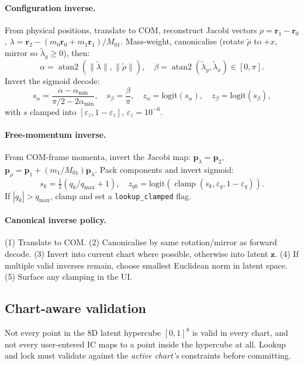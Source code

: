 \documentclass[11pt]{report}
\def\boldsymbol#1{#1}%
\DeclareMathOperator{\atanTwo}{atan2}
\DeclareMathOperator{\clamp}{clamp}
\begin{document}
\paragraph{Configuration inverse.} From physical positions, translate to COM, reconstruct Jacobi vectors $\boldsymbol\rho=\mathbf r_1-\mathbf r_0$, $\boldsymbol\lambda=\mathbf r_2-(m_0\mathbf r_0+m_1\mathbf r_1)/M_{01}$. Mass-weight, canonicalise (rotate $\tilde{\boldsymbol\rho}$ to $+x$, mirror so $\tilde\lambda_y\ge 0$), then:
\[
\alpha=\atanTwo(\|\tilde{\boldsymbol\lambda}\|,\|\tilde{\boldsymbol\rho}\|),\quad \beta=\atanTwo(\tilde\lambda_y,\tilde\lambda_x)\in[0,\pi].
\]
Invert the sigmoid decode:
\[
s_\alpha=\frac{\alpha-\alpha_{\min}}{\pi/2-2\alpha_{\min}},\quad s_\beta=\frac{\beta}{\pi},\quad z_{\alpha}=\mathrm{logit}(s_\alpha),\quad z_{\beta}=\mathrm{logit}(s_\beta),
\]
with $s$ clamped into $[\varepsilon_z,1-\varepsilon_z]$, $\varepsilon_z=10^{-6}$.

\paragraph{Free-momentum inverse.} From COM-frame momenta, invert the Jacobi map: $\mathbf p_\lambda=\mathbf p_2$, $\mathbf p_\rho=\mathbf p_1+(m_1/M_{01})\mathbf p_\lambda$. Pack components and invert sigmoid:
\[
s_k=\tfrac{1}{2}(q_k/q_{\max}+1),\quad z_{qk}=\mathrm{logit}(\clamp(s_k,\varepsilon_q,1-\varepsilon_q)).
\]
If $|q_k|>q_{\max}$, clamp and set a \texttt{lookup\_clamped} flag.

\paragraph{Canonical inverse policy.} (1) Translate to COM. (2) Canonicalise by same rotation/mirror as forward decode. (3) Invert into current chart where possible, otherwise into latent $\mathbf z$. (4) If multiple valid inverses remain, choose smallest Euclidean norm in latent space. (5) Surface any clamping in the UI.

\subsection{Chart-aware validation}
\label{sec:chart_validation}

Not every point in the 8D latent hypercube $[0,1]^{8}$ is valid in every chart, and not every user-entered IC maps to a point inside the hypercube at all. Lookup and lock must validate against the \emph{active chart's} constraints before committing.
\end{document}
